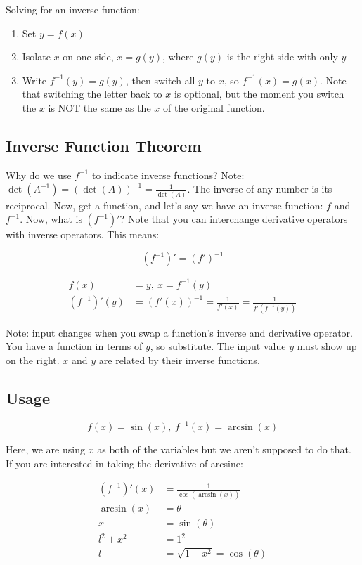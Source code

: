 \documentclass[
]{article}
\begin{document}
Solving for an inverse function:

\begin{enumerate}
\def\labelenumi{\arabic{enumi}.}
\item
  Set $y = f(x)$
\item
  Isolate $x$ on one side, $x = g(y)$, where $g(y)$ is the right
  side with only $y$
\item
  Write $f^{- 1}(y) = g(y)$, then switch all $y$ to $x$, so
  $f^{- 1}(x) = g(x)$. Note that switching the letter back to $x$ is
  optional, but the moment you switch the $x$ is NOT the same as the
  $x$ of the original function.
\end{enumerate}


\subsection{Inverse Function Theorem}

Why do we use $f^{- 1}$ to indicate inverse functions? Note:
$\det\left( A^{- 1} \right) = \left( \det(A) \right)^{- 1} = \frac{1}{\det(A)}$.
The inverse of any number is its reciprocal. Now, get a function, and
let's say we have an inverse function: $f$ and $f^{- 1}$. Now, what
is $(f^{- 1})'$? Note that you can interchange derivative operators
with inverse operators. This means:

$$\left( f^{- 1} \right)' = \left( f' \right)^{- 1}$$

\begin{align*}
f(x) &= y,\ x = f^{- 1}(y)
 \\
\left( f^{- 1} \right)'(y) &= \left( f'(x) \right)^{- 1} = \frac{1}{f'(x)} = \frac{1}{f'\left( f^{- 1}(y) \right)}
\end{align*}


Note: input changes when you swap a function's inverse and derivative
operator. You have a function in terms of $y$, so substitute. The
input value $y$ must show up on the right. $x$ and $y$ are related
by their inverse functions.


\subsection{Usage}

$$f(x) = \sin(x),\ f^{- 1}(x) = \arcsin(x)$$

Here, we are using $x$ as both of the variables but we aren't supposed
to do that. If you are interested in taking the derivative of arcsine:

\begin{align*}
\left( f^{- 1} \right)'(x) &= \frac{1}{\cos\left( \arcsin(x) \right)}
 \\
\arcsin(x) &= \theta
 \\
x &= \sin(\theta)
 \\
l^{2} + x^{2} &= 1^{2}
 \\
l &= \sqrt{1 - x^{2}} = \cos(\theta)
\end{align*}
\end{document}
